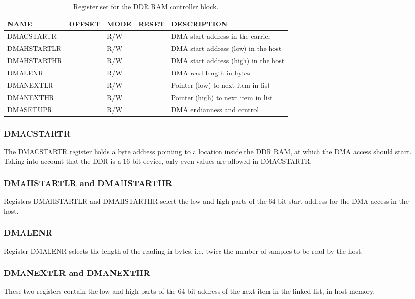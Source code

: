 \documentclass{article}
\begin{document}
\begin{table}[htbp]
  \centering
  \begin{tabularx}{\textwidth}{|l|r|l|l|X|}
    \hline
    \textbf{NAME} & \textbf{OFFSET} & \textbf{MODE} & \textbf{RESET} & \textbf{DESCRIPTION} \\
    \hline
    \hline
    DMACSTARTR & & R/W & & DMA start address in the carrier\\
    \hline
    DMAHSTARTLR & & R/W & & DMA start address (low) in the host\\
    \hline
    DMAHSTARTHR & & R/W & & DMA start address (high) in the host\\
    \hline
    DMALENR & & R/W & & DMA read length in bytes\\
    \hline
    DMANEXTLR & & R/W & & Pointer (low) to next item in list\\
    \hline
    DMANEXTHR & & R/W & & Pointer (high) to next item in list\\
    \hline
    DMASETUPR & & R/W & & DMA endianness and control\\
    \hline
  \end{tabularx}
  \caption{Register set for the DDR RAM controller block.}
  \label{tab:ddr_control}
\end{table}

\subsubsection{DMACSTARTR}
The DMACSTARTR register holds a byte address pointing to a location inside the DDR RAM, at which the DMA access should start. Taking into account that the DDR is a 16-bit device, only even values are allowed in DMACSTARTR.

\subsubsection{DMAHSTARTLR and DMAHSTARTHR}
Registers DMAHSTARTLR and DMAHSTARTHR select the low and high parts of the 64-bit start address for the DMA access in the host. 

\subsubsection{DMALENR}
Register DMALENR selects the length of the reading in bytes, i.e. twice the number of samples to be read by the host.

\subsubsection{DMANEXTLR and DMANEXTHR}
These two registers contain the low and high parts of the 64-bit address of the next item in the linked list, in host memory.
\end{document}
